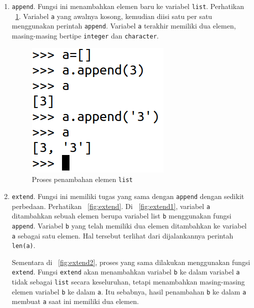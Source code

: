 \begin{enumerate}
  \item \texttt{append}. Fungsi ini menambahkan elemen baru ke variabel \texttt{list}. Perhatikan \figurename~\ref{fig:append}. Variabel \texttt{a} yang awalnya kosong, kemudian diisi satu per satu menggunakan perintah \texttt{append}. Variabel \texttt{a} terakhir memiliki dua elemen, masing-masing bertipe \texttt{integer} dan \texttt{character}.
  \begin{figure}
    \begin{center}
      \includegraphics[scale=1.25]{pics/append.png}
      \caption{Proses penambahan elemen \texttt{list}}
      \label{fig:append}
    \end{center}
  \end{figure}
  
  \item \texttt{extend}. Fungsi ini memiliki tugas yang sama dengan \texttt{append} dengan sedikit perbedaan. Perhatikan \figurename~\ref{fig:extend}. Di \figurename~\ref{fig:extend1}, variabel \texttt{a} ditambahkan sebuah elemen berupa variabel list \texttt{b} menggunakan fungsi \texttt{append}. Variabel \texttt{b} yang telah memiliki dua elemen ditambahkan ke variabel \texttt{a} sebagai satu elemen. Hal tersebut terlihat dari dijalankannya perintah \texttt{len(a)}.
  
Sementara di \figurename~\ref{fig:extend2}, proses yang sama dilakukan menggunakan fungsi \texttt{extend}. Fungsi \texttt{extend} akan menambahkan variabel \texttt{b} ke dalam variabel \texttt{a} tidak sebagai \texttt{list} secara keseluruhan, tetapi menambahkan masing-masing elemen variabel \texttt{b} ke dalam \texttt{a}. Itu sebabnya, hasil penambahan \texttt{b} ke dalam \texttt{a} membuat \texttt{a} saat ini memiliki dua elemen.
  

\end{enumerate}
